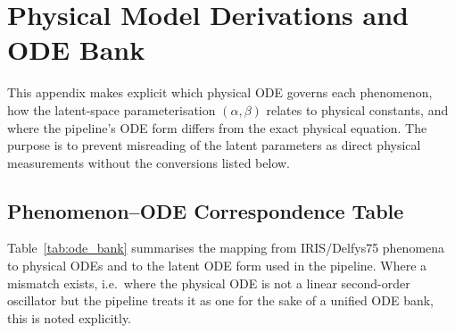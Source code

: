 \documentclass[runningheads]{llncs}
\begin{document}
\section{Physical Model Derivations and ODE Bank}
\label{app:ode_bank}

This appendix makes explicit which physical ODE governs each phenomenon,
how the latent-space parameterisation $(\alpha, \beta)$ relates to physical
constants, and where the pipeline's ODE form differs from the exact physical
equation. The purpose is to prevent misreading of the latent parameters as
direct physical measurements without the conversions listed below.

\subsection{Phenomenon–ODE Correspondence Table}
\label{app:ode_table}

Table~\ref{tab:ode_bank} summarises the mapping from IRIS/Delfys75
phenomena to physical ODEs and to the latent ODE form used in the pipeline.
Where a mismatch exists, i.e.\ where the physical ODE is not a linear
second-order oscillator but the pipeline treats it as one for the sake of
a unified ODE bank, this is noted explicitly.
\end{document}

